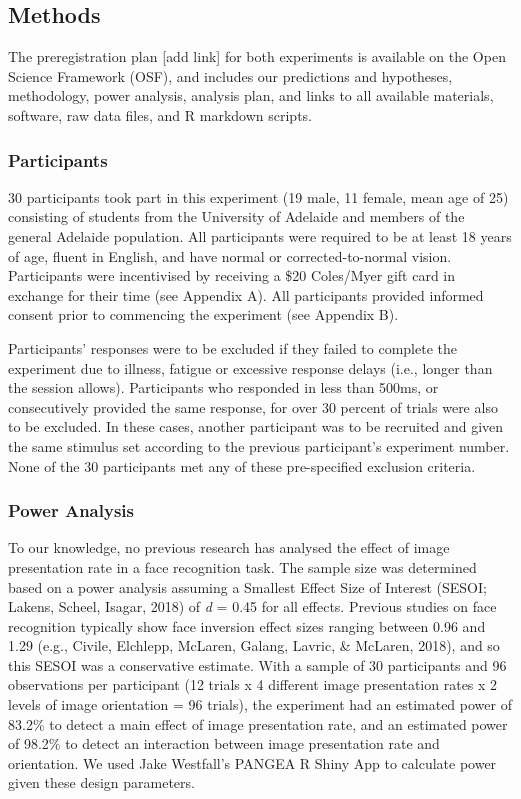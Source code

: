 \documentclass[
  english,
  man]{apa6}
\begin{document}
\hypertarget{methods}{%
\subsection{Methods}\label{methods}}

The preregistration plan {[}add link{]} for both experiments is available on the Open Science Framework (OSF), and includes our predictions and hypotheses, methodology, power analysis, analysis plan, and links to all available materials, software, raw data files, and R markdown scripts.

\hypertarget{participants}{%
\subsubsection{Participants}\label{participants}}

30 participants took part in this experiment (19 male, 11 female, mean age of 25) consisting of students from the University of Adelaide and members of the general Adelaide population. All participants were required to be at least 18 years of age, fluent in English, and have normal or corrected-to-normal vision. Participants were incentivised by receiving a \$20 Coles/Myer gift card in exchange for their time (see Appendix A). All participants provided informed consent prior to commencing the experiment (see Appendix B).

Participants' responses were to be excluded if they failed to complete the experiment due to illness, fatigue or excessive response delays (i.e., longer than the session allows). Participants who responded in less than 500ms, or consecutively provided the same response, for over 30 percent of trials were also to be excluded. In these cases, another participant was to be recruited and given the same stimulus set according to the previous participant's experiment number. None of the 30 participants met any of these pre-specified exclusion criteria.

\hypertarget{power-analysis}{%
\subsubsection{Power Analysis}\label{power-analysis}}

To our knowledge, no previous research has analysed the effect of image presentation rate in a face recognition task. The sample size was determined based on a power analysis assuming a Smallest Effect Size of Interest (SESOI; Lakens, Scheel, Isagar, 2018) of \emph{d} = 0.45 for all effects. Previous studies on face recognition typically show face inversion effect sizes ranging between 0.96 and 1.29 (e.g., Civile, Elchlepp, McLaren, Galang, Lavric, \& McLaren, 2018), and so this SESOI was a conservative estimate. With a sample of 30 participants and 96 observations per participant (12 trials x 4 different image presentation rates x 2 levels of image orientation = 96 trials), the experiment had an estimated power of 83.2\% to detect a main effect of image presentation rate, and an estimated power of 98.2\% to detect an interaction between image presentation rate and orientation. We used Jake Westfall's PANGEA R Shiny App to calculate power given these design parameters.
\end{document}
